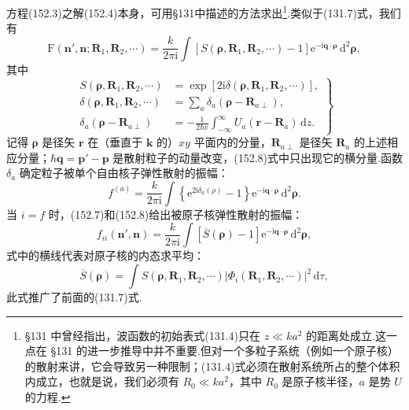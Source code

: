 方程(152.3)之解(152.4)本身，可用§131中描述的方法求出\footnote{§131 中曾经指出，波函数的初始表式(131.4)只在 $z\ll ka^2$ 的距离处成立.这一点在 §131 的进一步推导中并不重要.但对一个多粒子系统（例如一个原子核）的散射来讲，它会导致另一种限制；(131.4)式必须在散射系统所占的整个体积内成立，也就是说，我们必须有 $R_0\ll ka^2$，其中 $R_0$ 是原子核半径，$a$ 是势 $U$ 的力程.}.类似于(131.7)式，我们有
\begin{equation}
  \mathrm{F}(\boldsymbol{n}',\boldsymbol{n};\boldsymbol{R}_1,\boldsymbol{R}_2,\cdots)
  =\frac{k}{2\pi\mathrm{i}}\int\left[S(\boldsymbol{\rho},\boldsymbol{R}_1,\boldsymbol{R}_2,\cdots)-1\right]
  \mathrm{e}^{-\mathrm{i}\boldsymbol{q}\cdot\boldsymbol{\rho}}\,\mathrm{d}^2\boldsymbol{\rho},
\end{equation}
其中
\begin{equation}
\left.\begin{aligned}
  S(\boldsymbol{\rho},\boldsymbol{R}_1,\boldsymbol{R}_2,\cdots)
  &=\exp\left[2\mathrm{i}\delta(\boldsymbol{\rho},\boldsymbol{R}_1,\boldsymbol{R}_2,\cdots)\right],\\
  \delta(\boldsymbol{\rho},\boldsymbol{R}_1,\boldsymbol{R}_2,\cdots)
  &=\sum_a\delta_a(\boldsymbol{\rho}-\boldsymbol{R}_{a\perp}),\\
  \delta_a(\boldsymbol{\rho}-\boldsymbol{R}_{a\perp})
  &=-\frac{1}{2\hbar v}\int_{-\infty}^{\infty}U_a(\boldsymbol{r}-\boldsymbol{R}_a)\,\mathrm{d}z.
\end{aligned}\right\}
\end{equation}
记得 $\boldsymbol{\rho}$ 是径矢 $\boldsymbol{r}$ 在（垂直于 $\boldsymbol{k}$ 的）$xy$ 平面内的分量，$\boldsymbol{R}_{a\perp}$ 是径矢 $\boldsymbol{R}_a$ 的上述相应分量；$\hbar\boldsymbol{q}=\boldsymbol{p}'-\boldsymbol{p}$ 是散射粒子的动量改变，(152.8)式中只出现它的横分量.函数 $\delta_a$ 确定粒子被单个自由核子弹性散射的振幅：
\begin{equation}
  f^{(a)}=\frac{k}{2\pi\mathrm{i}}\int\left\{\mathrm{e}^{2\mathrm{i}\delta_a(\rho)}-1\right\}
  \mathrm{e}^{-\mathrm{i}\boldsymbol{q}\cdot\boldsymbol{\rho}}\,\mathrm{d}^2\boldsymbol{\rho}.
\end{equation}
当 $i=f$ 时，(152.7)和(152.8)给出被原子核弹性散射的振幅：
\begin{equation}
  f_{ii}(\boldsymbol{n}',\boldsymbol{n})=\frac{k}{2\pi\mathrm{i}}\int
  \left[\overline{S}(\boldsymbol{\rho})-1\right]
  \mathrm{e}^{-\mathrm{i}\boldsymbol{q}\cdot\boldsymbol{\rho}}\,\mathrm{d}^2\boldsymbol{\rho},
\end{equation}
式中的横线代表对原子核的内态求平均：
\begin{equation}
  \overline{S}(\boldsymbol{\rho})=\int
  S(\boldsymbol{\rho},\boldsymbol{R}_1,\boldsymbol{R}_2,\cdots)
  |\Phi_i(\boldsymbol{R}_1,\boldsymbol{R}_2,\cdots)|^2\,\mathrm{d}\tau,
\end{equation}
此式推广了前面的(131.7)式.

